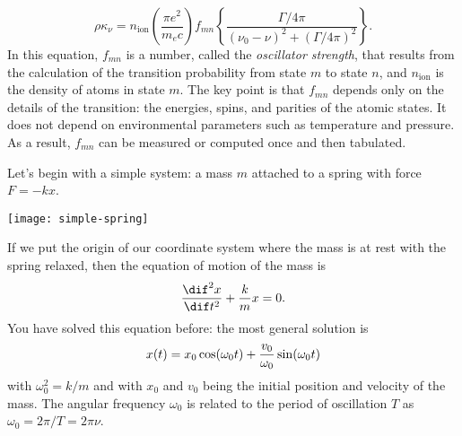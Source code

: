 \begin{equation}
    \rho\kappa_\nu = n_{\mathrm{ion}} \left(\frac{\pi e^2}{m_e c}\right) f_{mn}
        \left\{\frac{\Gamma/4\pi}{(\nu_0-\nu)^2 + (\Gamma/4\pi)^2}\right\}.
\end{equation}
In this equation, $f_{mn}$ is a number, called the \emph{oscillator strength}, that results from the calculation of the transition probability from state $m$ to state $n$, and $n_{\mathrm{ion}}$ is the density of atoms in state $m$.  The key point is that $f_{mn}$ depends only on the details of the transition: the energies, spins, and parities of the atomic states.  It does not depend on environmental parameters such as temperature and pressure.  As a result, $f_{mn}$ can be measured or computed once and then tabulated.

\begin{sidebar}
\label{sb.damped-driven-oscillator}
Let's begin with a simple system: a mass $m$ attached to a spring with force $F = -kx$.

\begin{center}
\texttt{[image: simple-spring]}
\end{center}

\noindent If we put the origin of our coordinate system where the mass is at rest with the spring relaxed, then the equation of motion of the mass is
\begin{equation}\label{e.SHO-basic}
	\DDtt{x} + \frac{k}{m} x = 0.
\end{equation}
You have solved this equation before: the most general solution is
\begin{equation}\label{e.SHO-general-solution}
	x(t) = x_{0}\cos(\omega_{0} t) + \frac{v_{0}}{\omega_{0}}\sin(\omega_{0} t)
\end{equation}
with $\omega_{0}^{2} = k/m$ and with $x_{0}$ and $v_{0}$ being the initial position and velocity of the mass. The angular frequency $\omega_{0}$ is related to the period of oscillation $T$ as $\omega_{0} = 2\pi/T = 2\pi\nu$.


\end{sidebar}
